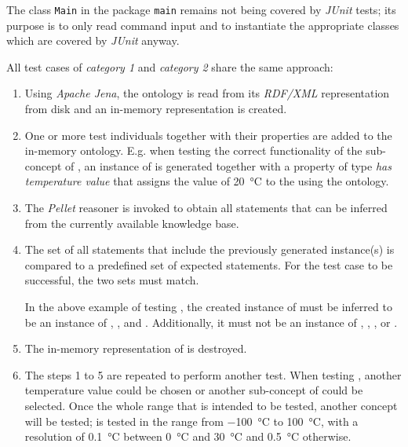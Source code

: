 The class \texttt{Main} in the package \texttt{main} remains not being covered by \emph{JUnit} tests; its purpose is to only read command input and to instantiate the appropriate classes which are covered by \emph{JUnit} anyway.

All test cases of \emph{category 1} and \emph{category 2} share the same approach:

\begin{enumerate}
  \item Using \emph{Apache Jena}, the \smarthomeweather ontology is read from its \emph{RDF/XML} representation from disk and an in-memory representation is created.
  \item One or more test individuals together with their properties are added to the in-memory ontology. E.g. when testing the correct functionality of the sub-concept  of , an instance of  is generated together with a property of type \emph{has temperature value} that assigns the value of \SI{20}{\celsius} to the  using the \muo ontology.
  \item The \emph{Pellet} reasoner is invoked to obtain all statements that can be inferred from the currently available knowledge base.
  \item The set of all statements that include the previously generated instance(s) is compared to a predefined set of expected statements. For the test case to be successful, the two sets must match.
  
  In the above example of testing , the created instance of  must be inferred to be an instance of , , and . Additionally, it must not be an instance of , , ,  or .
  \item The in-memory representation of \smarthomeweather is destroyed.
  \item The steps 1 to 5 are repeated to perform another test. When testing , another temperature value could be chosen or another sub-concept of  could be selected.
  Once the whole range that is intended to be tested, another concept will be tested; %
   is tested in the range from \SI{-100}{\celsius} to \SI{100}{\celsius}, with a resolution of \SI{0.1}{\celsius} between \SI{0}{\celsius} and \SI{30}{\celsius} and \SI{0.5}{\celsius} otherwise.
\end{enumerate}


